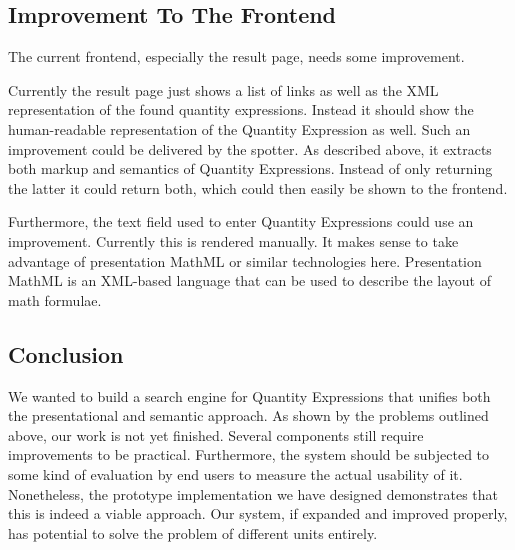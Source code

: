 \subsection{Improvement To The Frontend}
\label{sec:fut_res}

The current frontend, especially the result page, needs some improvement.

Currently the result page just shows a list of links as well as the XML representation of the found quantity expressions. Instead it should show the human-readable representation of the Quantity Expression as well. Such an improvement could be delivered by the spotter. As described above, it extracts both markup and semantics of Quantity Expressions. Instead of only returning the latter it could return both, which could then easily be shown to the frontend.

Furthermore, the text field used to enter Quantity Expressions could use an improvement. Currently this is rendered manually. It makes sense to take advantage of presentation MathML or similar technologies here. Presentation MathML is an XML-based language that can be used to describe the layout of math formulae.

\subsection{Conclusion}

We wanted to build a search engine for Quantity Expressions that unifies both the presentational and semantic approach. As shown by the problems outlined above, our work is not yet finished. Several components still require improvements to be practical. Furthermore, the system should be subjected to some kind of evaluation by end users to measure the actual usability of it. Nonetheless, the prototype implementation we have designed demonstrates that this is indeed a viable approach. Our system, if expanded and improved properly, has potential to solve the problem of different units entirely. 
